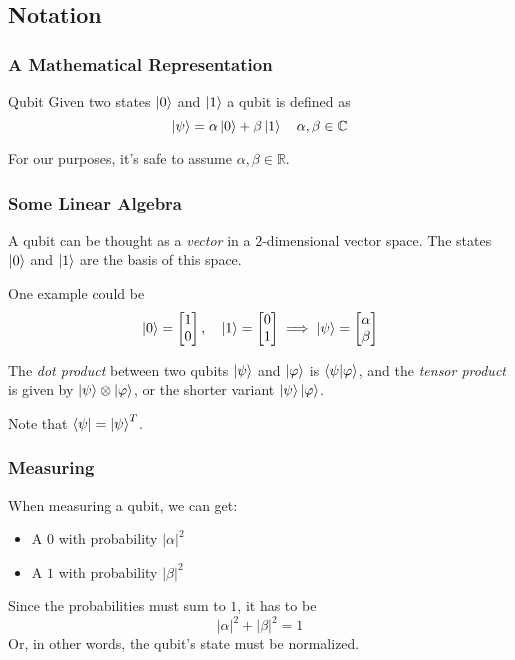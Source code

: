 \documentclass{beamer}
\begin{document}
  \subsection{Notation}
  \begin{frame}
    \frametitle{A Mathematical Representation}
    \begin{block}{Qubit}
      Given two states $\ket{0}$ and $\ket{1}$ a qubit is defined as
      \begin{equation*}
        \ket{\psi} = \alpha\ket{0} + \beta\ket{1} \quad \alpha,\beta\in\mathbb C
      \end{equation*}
    \end{block}

    For our purposes, it's safe to assume $\alpha,\beta\in\mathbb R$.
  \end{frame}
  \begin{frame}
    \frametitle{Some Linear Algebra}
    A qubit can be thought as a \textit{vector} in a $2$-dimensional vector space.
    The states $\ket 0$ and $\ket 1$ are the basis of this space.

    One example could be
    \begin{equation*}
      \ket{0} = \begin{bmatrix} 1 \\ 0 \end{bmatrix},
      \quad
      \ket{1} = \begin{bmatrix} 0 \\ 1 \end{bmatrix}
      \implies
      \ket{\psi} = \begin{bmatrix} \alpha \\ \beta \end{bmatrix}
    \end{equation*}

    The \textit{dot product} between two qubits $\ket{\psi}$ and $\ket{\varphi}$ is
    $\braket{\psi|\varphi}$, and the \textit{tensor product} is given by $\ket{\psi}\otimes\ket{\varphi}$, or
    the shorter variant $\ket{\psi}\ket{\varphi}$.

    Note that $\bra{\psi} = \ket{\psi}^T$.
  \end{frame}
  \begin{frame}
    \frametitle{Measuring}
    When measuring a qubit, we can get:
    \begin{itemize}
      \item A $0$ with probability $|\alpha|^2$
      \item A $1$ with probability $|\beta|^2$
    \end{itemize}

    Since the probabilities must sum to $1$, it has to be
    \begin{equation*}
      |\alpha|^2 + |\beta|^2 = 1
    \end{equation*}
    Or, in other words, the qubit's state must be normalized.
  \end{frame}
\end{document}
